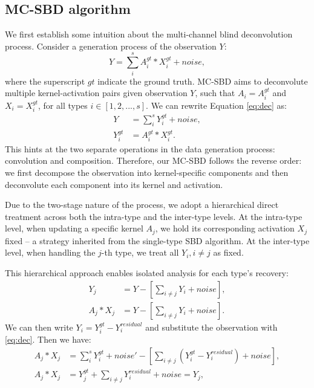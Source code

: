 \subsection{MC-SBD algorithm}
We first establish some intuition about the multi-channel blind deconvolution process. Consider a generation process of the observation $Y$: 
\begin{equation}
	\label{eq:dec}
	Y = \sum_{i}^{s} A_i^{gt} * X_i^{gt} + noise, 
\end{equation}
\noindent where the superscript $gt$ indicate the ground truth. \ac{MC-SBD} aims to deconvolute multiple kernel-activation pairs given observation $Y$, such that $A_i=A_i^{gt}$ and $X_i = X_i^{gt}$, for all types $i \in [1,2,...,s]$. We can rewrite Equation \ref{eq:dec} as: 
\begin{align}
	Y &= \sum_{i}^{s} Y_i^{gt} + noise,\\ 
	Y_i^{gt} &= A_i^{gt} * X_i^{gt}.
\end{align}
\noindent This hints at the two separate operations in the data generation process: convolution and composition. Therefore, our \ac{MC-SBD} follows the reverse order: we first decompose the observation into kernel-specific components and then deconvolute each component into its kernel and activation. 

Due to the two-stage nature of the process, we adopt a hierarchical direct treatment across both the intra-type and the inter-type levels. At the intra-type level, when updating a specific kernel $A_j$, we hold its corresponding activation $X_j$ fixed -- a strategy inherited from the single-type \ac{SBD} algorithm. At the inter-type level, when handling the $j$-th type, we treat all $Y_i, i\neq j$ as fixed. 

This hierarchical approach enables isolated analysis for each type’s recovery:
\begin{align}
	Y_j &= Y - [\sum_{i\neq j}Y_i + noise],\\
	A_j * X_j &= Y - [\sum_{i\neq j}Y_i + noise].
\end{align} 
\noindent We can then write $Y_i = Y_i^{gt}- Y_i^{residual}$ and substitute the observation with \ref{eq:dec}. Then we have:
\begin{align}
	A_j * X_j &= \sum_{i}^{s} Y_i^{gt} + noise' - [\sum_{i\neq j}(Y_i^{gt}- Y_i^{residual}) + noise],\\ \label{eq:622}
	A_j * X_j &= Y_j^{gt}+ \sum_{i\neq j}Y_i^{residual} + noise = Y_j,
\end{align} 

